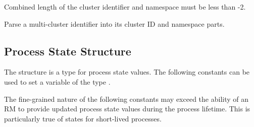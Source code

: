Combined length of the cluster identifier and namespace must be less than -2.


Parse a multi-cluster identifier into its cluster ID and namespace parts.


\begin{arglist}
\end{arglist}


\subsection{Process State Structure}
\label{api:struct:processstate}

The  structure is a  type for process state values. The following constants can be used to set a variable of the type .

\adviceuserstart
The fine-grained nature of the following constants may exceed the ability of an \ac{RM} to provide updated process state values during the process lifetime. This is particularly true of states for short-lived processes.
\adviceuserend

